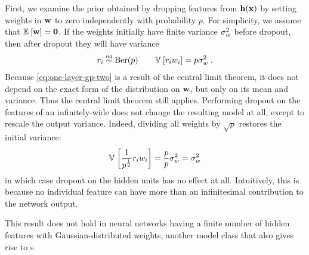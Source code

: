 First, we examine the prior obtained by dropping features from ${\bf{h}}({\bf{x}})$ by setting weights in ${\bf{w}}$ to zero independently with probability $p$.
For simplicity, we assume that $\mathbb{E}_{} \left[ {{\bf{w}}} \right] = {\bf{0}}$.
If the weights initially have finite variance $\sigma^2_{w}$ before dropout, then after dropout they will have variance
%
\begin{align}
r_i \overset{\mbox{\tiny iid}}{\sim} \textnormal{Ber}(p) \qquad
\mathbb{V}_{} \left[ {r_i w_i} \right] = p \sigma_{w}^2 \;.
\end{align}
%
Because \cref{eq:one-layer-gp-two} is a result of the central limit theorem, it does not depend on the exact form of the distribution on ${\bf{w}}$, but only on its mean and variance.
Thus the central limit theorem still applies.
Performing dropout on the features of an infinitely-wide \MLP{} does not change the resulting model at all, except to rescale the output variance.
Indeed, dividing all weights by $\sqrt p$ restores the initial variance:
%
\begin{align}
\mathbb{V}_{} \left[ { \frac{1}{p^\frac{1}{2}} r_i w_i} \right] = \frac{p}{p} \sigma_{w}^2 = \sigma_{w}^2
\end{align}
%
in which case dropout on the hidden units has no effect at all.
Intuitively, this is because no individual feature can have more than an infinitesimal contribution to the network output.

This result does not hold in neural networks having a finite number of hidden features with Gaussian-distributed weights, another model class that also gives rise to \gp{}s.



